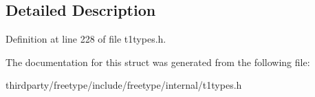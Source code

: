 \subsection{Detailed Description}


Definition at line 228 of file t1types.\+h.



The documentation for this struct was generated from the following file\+:\begin{DoxyCompactItemize}
\item 
thirdparty/freetype/include/freetype/internal/t1types.\+h\end{DoxyCompactItemize}
